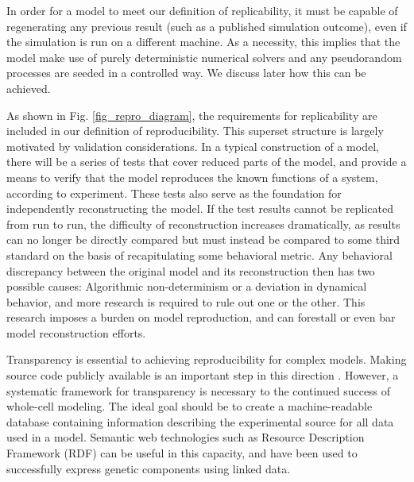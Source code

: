 \documentclass[journal,transmag,twoside]{IEEEtran}
\begin{document}
In order for a model to meet our definition of replicability,
it must be capable of regenerating any previous result (such as a published simulation outcome),
even if the simulation is run on a different machine.
As a necessity, this implies that the model make use of purely deterministic numerical solvers
and any pseudorandom processes are seeded in a controlled way.
We discuss later how this can be achieved.

As shown in Fig. \ref{fig_repro_diagram}, the requirements for replicability are
included in our definition of reproducibility.
This superset structure is largely motivated by validation considerations.
In a typical construction of a model, there will be a series of tests
that cover reduced parts of the model, and provide a means to verify
that the model reproduces the known functions of a system, according to experiment.
These tests also serve as the foundation for independently reconstructing the model.
If the test results cannot be replicated from run to run, the difficulty of reconstruction
increases dramatically, as results can no longer be directly compared but must instead
be compared to some third standard on the basis of recapitulating some behavioral metric.
Any behavioral discrepancy between the original model and its reconstruction
then has two possible causes: Algorithmic non-determinism or a deviation in dynamical
behavior, and more research is required to rule out one or the other.
This research imposes a burden on model reproduction, and can forestall or even bar
model reconstruction efforts.


Transparency is essential to achieving reproducibility for complex models.
Making source code publicly available is an important step in this direction \cite{easterbrook2014open}.
However, a systematic framework for transparency is necessary to the continued success of whole-cell modeling.
The ideal goal should be to create a machine-readable database containing information describing the experimental source for all data used in a model.
Semantic web technologies such as Resource Description Framework (RDF) can be useful in this capacity, and have been used to successfully express genetic components \cite{galdzicki2014synthetic} using linked data.
\end{document}
